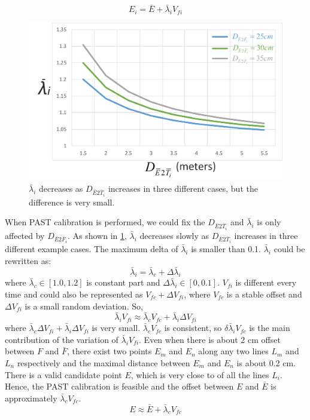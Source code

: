 \begin{equation} \label{equ:P_eye2}
E_i = {\bar E} + \bar\lambda_i V_{fi}  
\end{equation}
\begin{figure} [htb]
	\centering
	\includegraphics[width= \linewidth]{figures/4-PAST/lambdai.png}
	\caption{$\bar \lambda_i$ decreases as $D_{\bar E2 \bar T_i}$ increases in three different cases, but the difference is very small.}
	\label{fig:4-PAST:lambdai}
\end{figure}
When PAST calibration is performed, we could fix the $D_{\bar E2 \bar T_i}$ and $\bar \lambda_i$ is only affected by $ D_{\bar E2 \bar F_i}$. As shown in \figurename{ \ref{fig:4-PAST:lambdai}}, $\bar \lambda_i$ decreases slowly as $D_{\bar E2 \bar T_i}$ increases in three different example cases. The maximum delta of $\bar \lambda_i$ is smaller than 0.1. $\bar\lambda_i$ could be rewritten as:
\begin{equation} \label{equ:lambdai}
\bar\lambda_i = \bar\lambda_c + \Delta \bar\lambda_i
\end{equation}
where $\bar\lambda_c \in \left[1.0,1.2\right]$ is constant part and $\Delta \bar\lambda_i \in \left[0,0.1\right] $. 
$V_{fi}$ is different every time and could also be represented as $V_{fc} + {\Delta V_{fi}}$, where $V_{fc}$ is a stable offset and ${\Delta V_{fi}}$ is a small random deviation. So,
\begin{equation} \label{equ:lambdavf}
\bar\lambda_i V_{fi} \approx  \bar\lambda_c V_{fc}  + \bar\lambda_i {\Delta V_{fi}} %
\end{equation}
where $\bar\lambda_c {\Delta V_{fi}} + \bar\lambda_i {\Delta V_{fi}}$ is very small.  $\bar\lambda_c V_{fc}$ is consistent, so $\delta \bar\lambda_{i} V_{fc}$ is the main contribution of the variation of $\bar\lambda_i V_{fi}$. Even when there is about 2 cm offset between $F$ and $\bar{F}$, there exist two points $E_m$ and $E_n$ along any two lines $L_m$ and $L_n$ respectively and the maximal distance between $E_m$ and $E_n$ is about 0.2 cm. There is a valid candidate point $E$, which is very close to of all the lines $L_i$. Hence, the PAST calibration is feasible and the offset between $E$ and $\bar{E}$ is approximately $ \bar\lambda_c V_{fc}$. 
\begin{equation} \label{equ:P_eyeCalib}
E \approx {\bar E} + \bar\lambda_c V_{fc} 
\end{equation} 

